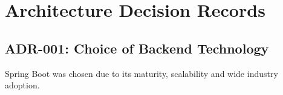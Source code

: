 \section{Architecture Decision Records}

\subsection{ADR-001: Choice of Backend Technology}
Spring Boot was chosen due to its maturity, scalability and wide industry adoption.
